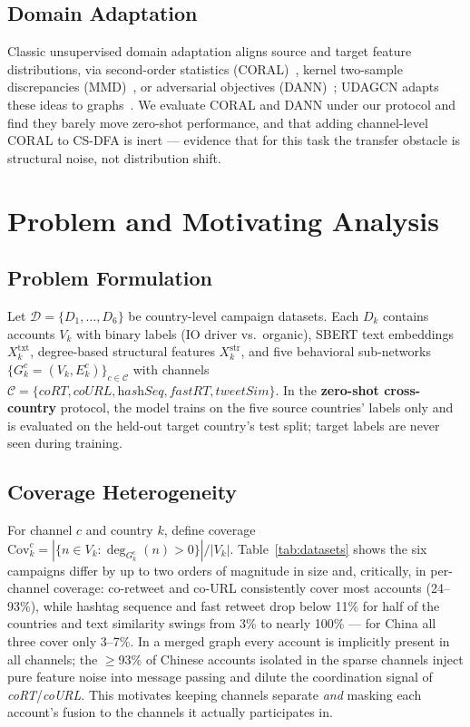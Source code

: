 \documentclass[conference]{IEEEtran}
\newcommand{\method}{CS-DFA}
\begin{document}
\subsection{Domain Adaptation}
Classic unsupervised domain adaptation aligns source and target feature
distributions, via second-order statistics (CORAL)~\cite{sun2016coral,
sun2016return}, kernel two-sample discrepancies (MMD)~\cite{gretton2012kernel},
or adversarial objectives (DANN)~\cite{ganin2016dann}; UDAGCN adapts these
ideas to graphs~\cite{wu2020udagcn}. We evaluate CORAL and DANN under our
protocol and find they barely move zero-shot performance, and that adding
channel-level CORAL to \method{} is inert --- evidence that for this task the
transfer obstacle is structural noise, not distribution shift.

\section{Problem and Motivating Analysis}
\label{sec:analysis-motivation}

\subsection{Problem Formulation}
Let $\mathcal{D} = \{D_1, \dots, D_6\}$ be country-level campaign datasets.
Each $D_k$ contains accounts $V_k$ with binary labels (IO driver vs.\
organic), SBERT text embeddings $X^{\text{txt}}_k$, degree-based structural
features $X^{\text{str}}_k$, and five behavioral sub-networks
$\{G_k^c = (V_k, E_k^c)\}_{c \in \mathcal{C}}$ with channels
$\mathcal{C} = \{\textit{coRT}, \textit{coURL}, \textit{hashSeq},
\textit{fastRT}, \textit{tweetSim}\}$. In the \textbf{zero-shot
cross-country} protocol, the model trains on the five source countries'
labels only and is evaluated on the held-out target country's test split;
target labels are never seen during training.

\subsection{Coverage Heterogeneity}
For channel $c$ and country $k$, define coverage
$\mathrm{Cov}_k^c = |\{n \in V_k : \deg_{G_k^c}(n) > 0\}| / |V_k|$.
Table~\ref{tab:datasets} shows the six campaigns differ by up to two orders
of magnitude in size and, critically, in per-channel coverage: co-retweet
and co-URL consistently cover most accounts (24--93\%), while hashtag
sequence and fast retweet drop below 11\% for half of the countries and text
similarity swings from 3\% to nearly 100\% --- for China all three cover
only 3--7\%. In a merged graph every account is
implicitly present in all channels; the $\ge$93\% of Chinese accounts
isolated in the sparse channels inject pure feature noise into message
passing and dilute the coordination signal of \textit{coRT}/\textit{coURL}.
This motivates keeping channels separate \emph{and} masking each account's
fusion to the channels it actually participates in.
\end{document}

